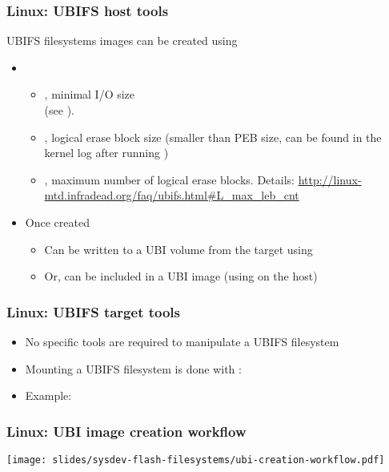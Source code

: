 \begin{frame}
  \frametitle{Linux: UBIFS host tools}
  UBIFS filesystems images can be created using 
    \begin{itemize}
    \item {}
      \begin{itemize}
      \item {}, minimal I/O size\\
                 (see ).
      \item {}, logical erase block size (smaller than
                 PEB size, can be found in the kernel log after running
 		 )
      \item {}, maximum number of logical erase
        blocks. Details:
        {\tiny\url{http://linux-mtd.infradead.org/faq/ubifs.html\#L_max_leb_cnt}}
      \end{itemize}
    \item Once created
      \begin{itemize}
      \item Can be written to a UBI volume from the target using
      \item Or, can be included in a UBI image (using 
        on the host)
      \end{itemize}
    \end{itemize}
\end{frame}

\begin{frame}
  \frametitle{Linux: UBIFS target tools}
  \begin{itemize}
  \item No specific tools are required to manipulate a UBIFS filesystem
  \item Mounting a UBIFS filesystem is done with :\\
  \item Example:\\
  \end{itemize}
\end{frame}

\begin{frame}
  \frametitle{Linux: UBI image creation workflow}
  \begin{center}
    \texttt{[image: slides/sysdev-flash-filesystems/ubi-creation-workflow.pdf]}
  \end{center}
\end{frame}


